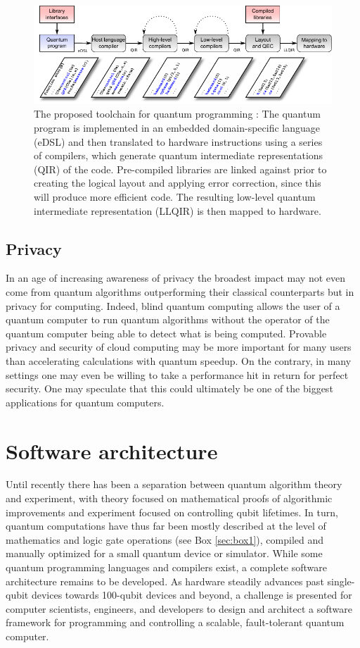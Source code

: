\documentclass[journal]{IEEEtran}
\begin{document}
\begin{figure}[t]
\centering
\includegraphics[width=\textwidth]{figures/coarse_toolchain}
\caption{The proposed toolchain for quantum programming \cite{stack}: The quantum program is implemented in an embedded domain-specific language (eDSL) and then translated to hardware instructions using a series of compilers, which generate quantum intermediate representations (QIR) of the code. Pre-compiled libraries are linked against prior to creating the logical layout and applying error correction, since this will produce more efficient code. The resulting low-level quantum intermediate representation (LLQIR) is then mapped to hardware.}
\label{fig:toolchain}
\end{figure}

\subsection{Privacy}

In an age of increasing awareness of privacy the broadest impact may not even come from quantum algorithms outperforming their classical counterparts but in  privacy for computing. Indeed, blind quantum computing \cite{blind} allows the user of a quantum computer to run quantum algorithms without the operator of the  quantum computer being able to detect what is being computed. Provable privacy and security of cloud computing may be more important for many users than accelerating calculations with quantum speedup. On the contrary, in many settings one may even be willing to take a performance hit in return for perfect security. One may speculate that this could ultimately be one of the biggest applications for quantum computers.

 
\section{Software architecture}


Until recently there has been a separation between quantum algorithm theory and experiment, with theory focused on mathematical proofs of algorithmic improvements and experiment focused on controlling qubit lifetimes.  In turn, quantum computations have thus far been mostly described at the level of mathematics and logic gate operations (see Box \ref{sec:box1}), compiled and manually optimized for a small quantum device or simulator.  While some quantum programming languages and compilers exist, a complete software architecture remains to be developed.
As hardware steadily advances past single-qubit devices towards 100-qubit devices and beyond, a challenge is presented for computer scientists, engineers, and developers to design and architect a software framework for programming and controlling a scalable, fault-tolerant quantum computer.
\end{document}
